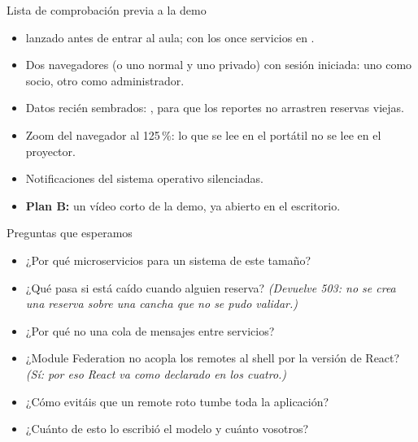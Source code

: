 \begin{frame}{Lista de comprobación previa a la demo}

  \begin{itemize}\footnotesize
    \item {} lanzado \alert{antes} de entrar al
          aula;  con los once servicios en
          .
    \item Dos navegadores (o uno normal y uno privado) con sesión iniciada:
          uno como socio, otro como administrador.
    \item Datos recién sembrados: , para que los reportes no arrastren reservas
          viejas.
    \item Zoom del navegador al 125\,\%: lo que se lee en el portátil no se
          lee en el proyector.
    \item Notificaciones del sistema operativo silenciadas.
    \item \textbf{Plan B:} un vídeo corto de la demo, ya abierto en el
          escritorio.
  \end{itemize}
\end{frame}

\begin{frame}{Preguntas que esperamos}

  \begin{itemize}\footnotesize
    \item ¿Por qué microservicios para un sistema de este tamaño?
    \item ¿Qué pasa si  está caído cuando alguien reserva?
          \emph{(Devuelve 503: no se crea una reserva sobre una cancha que no
          se pudo validar.)}
    \item ¿Por qué no una cola de mensajes entre servicios?
    \item ¿Module Federation no acopla los remotes al shell por la versión de
          React? \emph{(Sí: por eso React va como  declarado en
          los cuatro.)}
    \item ¿Cómo evitáis que un remote roto tumbe toda la aplicación?
    \item ¿Cuánto de esto lo escribió el modelo y cuánto vosotros?
  \end{itemize}
\end{frame}
